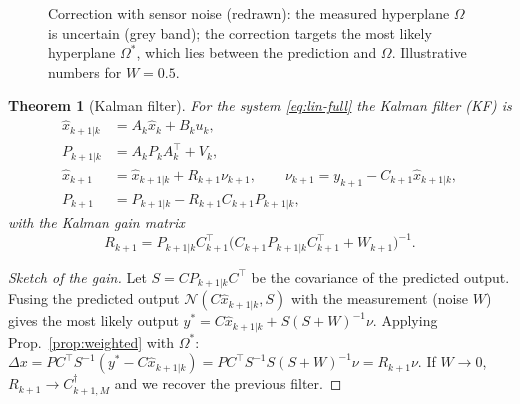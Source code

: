 \documentclass[11pt,a4paper]{article}
\def\boldsymbol#1{#1}%
\def\mathbf#1{#1}%
\newcommand{\tp}{^{\top}}
\newcommand{\pinv}{^{\dagger}}
\newcommand{\hx}{\hat{\boldsymbol{x}}}
\newcommand{\bx}{\boldsymbol{x}}
\newcommand{\bu}{\boldsymbol{u}}
\newcommand{\by}{\boldsymbol{y}}
\newcommand{\bnu}{\boldsymbol{\nu}}
\newcommand{\mA}{\mathbf{A}}
\newcommand{\mB}{\mathbf{B}}
\newcommand{\mC}{\mathbf{C}}
\newcommand{\mP}{\mathbf{P}}
\newcommand{\mR}{\mathbf{R}}
\newcommand{\mS}{\mathbf{S}}
\newcommand{\mV}{\mathbf{V}}
\newcommand{\mW}{\mathbf{W}}
\theoremstyle{definition}
\theoremstyle{plain}
\newtheorem{theorem}[definition]{Theorem}
\theoremstyle{remark}
\begin{document}
\begin{figure}[H]
\centering
{}
\caption{Correction with sensor noise (redrawn): the measured hyperplane $\Omega$ is uncertain (grey band); the correction targets the most
likely hyperplane $\Omega^*$, which lies between the prediction and $\Omega$. Illustrative numbers for $\mW=0.5$.}\label{fig:omegastar}
\end{figure}

\begin{theorem}[Kalman filter]\label{thm:kf}
For the system \eqref{eq:lin-full} the Kalman filter (KF) is
\begin{align}
\hx_{k+1|k}&=\mA_k\hx_k+\mB_k\bu_k,\nonumber\\
\mP_{k+1|k}&=\mA_k\mP_k\mA_k\tp+\mV_k,\nonumber\\
\hx_{k+1}&=\hx_{k+1|k}+\mR_{k+1}\bnu_{k+1},\qquad \bnu_{k+1}=\by_{k+1}-\mC_{k+1}\hx_{k+1|k},\label{eq:kf}\\
\mP_{k+1}&=\mP_{k+1|k}-\mR_{k+1}\mC_{k+1}\mP_{k+1|k},\nonumber
\end{align}
with the \emph{Kalman gain matrix}
\begin{equation}\label{eq:gain}
\mR_{k+1}=\mP_{k+1|k}\mC_{k+1}\tp\big(\mC_{k+1}\mP_{k+1|k}\mC_{k+1}\tp+\mW_{k+1}\big)^{-1}.
\end{equation}
\end{theorem}
\begin{proof}[Sketch of the gain]
Let $\mS=\mC\mP_{k+1|k}\mC\tp$ be the covariance of the predicted output. Fusing the predicted output
$\mathcal N(\mC\hx_{k+1|k},\mS)$ with the measurement (noise $\mW$) gives the most likely output
$\by^*=\mC\hx_{k+1|k}+\mS(\mS+\mW)^{-1}\bnu$. Applying Prop.~\ref{prop:weighted} with $\Omega^*$:
$\Delta\bx=\mP\mC\tp\mS^{-1}(\by^*-\mC\hx_{k+1|k})=\mP\mC\tp\mS^{-1}\mS(\mS+\mW)^{-1}\bnu=\mR_{k+1}\bnu$.
If $\mW\to0$, $\mR_{k+1}\to\mC_{k+1,M}\pinv$ and we recover the previous filter.
\end{proof}
\end{document}
